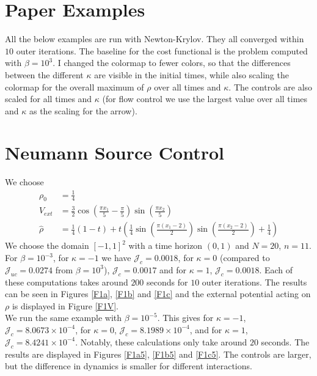 \documentclass[11pt, a4paper]{article}
\theoremstyle{definition}
\newcommand{\hr}{\widehat \rho}
\begin{document}
	\section*{Paper Examples}
	All the below examples are run with Newton-Krylov. They all converged within $10$ outer iterations. The baseline for the cost functional is the problem computed with $\beta = 10^3$.
	I changed the colormap to fewer colors, so that the differences between the different $\kappa$ are visible in the initial times, while also scaling the colormap for the overall maximum of $\rho$ over all times and $\kappa$.
	The controls are also scaled for all times and $\kappa$ (for flow control we use the largest value over all times and $\kappa$ as the scaling for the arrow).
	\section{Neumann Source Control}
	We choose 
	\begin{align*}
		\rho_0 &= \frac{1}{4}\\
		V_{ext} &= \frac{3}{2}\cos\left(\frac{\pi x_1}{5} - \frac{\pi}{5}\right)\sin\left(\frac{\pi x_2}{5}\right)\\
		\hr &= \frac{1}{4}(1 - t) + t\left(\frac{1}{4}\sin\left(\frac{\pi \left(x_1 - 2\right)}{2}\right)\sin\left(\frac{\pi (x_2 - 2)}{2}\right) + \frac{1}{4}\right)
	\end{align*}
	We choose the domain $[-1,1]^2$ with a time horizon $(0,1)$ and $N = 20$, $n = 11$. 
	For $\beta = 10^{-3}$, for $\kappa = -1$ we have $\mathcal J_c = 0.0018$, for $\kappa = 0$ (compared to $\mathcal J_{uc} = 0.0274$ from $\beta = 10^3$), $\mathcal J_c = 0.0017$ and for $\kappa = 1$, $\mathcal J_c = 0.0018$. Each of these computations takes around $200$ seconds for $10$ outer iterations. The results can be seen in Figures \ref{F1a}, \ref{F1b} and \ref{F1c} and the external potential acting on $\rho$ is displayed in Figure \ref{F1V}.\\
	We run the same example with $\beta = 10^{-5}$. This gives for $\kappa = -1$, $\mathcal J_c = 8.0673 \times 10^{-4}$, for $\kappa = 0$, $\mathcal J_c = 8.1989 \times 10^{-4}$, and for $\kappa = 1$, $\mathcal J_c = 8.4241 \times 10^{-4}$. Notably, these calculations only take around $20$ seconds. The results are displayed in Figures \ref{F1a5}, \ref{F1b5} and \ref{F1c5}. The controls are larger, but the difference in dynamics is smaller for different interactions.
	
\end{document}
